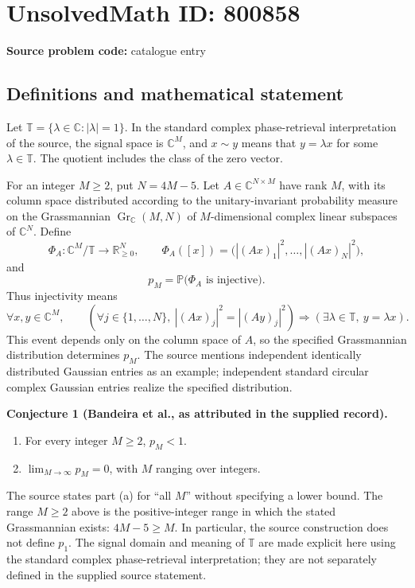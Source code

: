 \documentclass[11pt]{article}
\begin{document}
\section*{UnsolvedMath ID: 800858}
\textbf{Source problem code:} catalogue entry
\subsection{Definitions and mathematical statement}
Let \(\mathbb{T}=\{\lambda\in\mathbb{C}:|\lambda|=1\}\). In the standard complex phase-retrieval interpretation of the source, the signal space is \(\mathbb{C}^{M}\), and \(x\sim y\) means that \(y=\lambda x\) for some \(\lambda\in\mathbb{T}\). The quotient includes the class of the zero vector.

For an integer \(M\geq 2\), put \(N=4M-5\). Let \(A\in\mathbb{C}^{N\times M}\) have rank \(M\), with its column space distributed according to the unitary-invariant probability measure on the Grassmannian \(\operatorname{Gr}_{\mathbb{C}}(M,N)\) of \(M\)-dimensional complex linear subspaces of \(\mathbb{C}^{N}\). Define
\[
\Phi_A:\mathbb{C}^{M}/\mathbb{T}\longrightarrow\mathbb{R}_{\geq0}^{N},\qquad
\Phi_A([x])=\bigl(|(Ax)_1|^2,\ldots,|(Ax)_N|^2\bigr),
\]
and
\[
p_M=\mathbb{P}\bigl(\Phi_A\text{ is injective}\bigr).
\]
Thus injectivity means
\[
\forall x,y\in\mathbb{C}^{M},\qquad
\left(\forall j\in\{1,\ldots,N\},\ |(Ax)_j|^2=|(Ay)_j|^2\right)
\Longrightarrow
\left(\exists\lambda\in\mathbb{T},\ y=\lambda x\right).
\]
This event depends only on the column space of \(A\), so the specified Grassmannian distribution determines \(p_M\). The source mentions independent identically distributed Gaussian entries as an example; independent standard circular complex Gaussian entries realize the specified distribution.

\textbf{Conjecture 1 (Bandeira et al., as attributed in the supplied record).}
\begin{enumerate}
\item[(a)] For every integer \(M\geq2\), \(p_M<1\).
\item[(b)] \(\displaystyle\lim_{M\to\infty}p_M=0\), with \(M\) ranging over integers.
\end{enumerate}
The source states part (a) for ``all \(M\)'' without specifying a lower bound. The range \(M\geq2\) above is the positive-integer range in which the stated Grassmannian exists: \(4M-5\geq M\). In particular, the source construction does not define \(p_1\). The signal domain and meaning of \(\mathbb{T}\) are made explicit here using the standard complex phase-retrieval interpretation; they are not separately defined in the supplied source statement.
\end{document}

